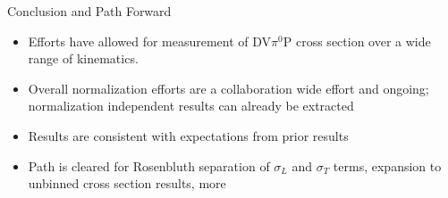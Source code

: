 \documentclass[aspectratio=169]{beamer}
\begin{document}

\begin{frame}{Conclusion and Path Forward}
\begin{itemize}
    \setlength\itemsep{1em}
    \item Efforts have allowed for measurement of DV$\pi^0$P cross section over a wide range of kinematics.
    \item Overall normalization efforts are a collaboration wide effort and ongoing; normalization independent results can already be extracted
    \item Results are consistent with expectations from prior results
    \item Path is cleared for Rosenbluth separation of $\sigma_L$ and $\sigma_T$ terms, expansion to unbinned cross section results, more
\end{itemize}


\end{frame}
    
\end{document}
